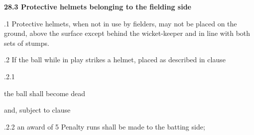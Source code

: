 \documentclass[12pt]{article}
\begin{document}
\vspace{\baselineskip}
{\fontsize{11pt}{13.2pt}\selectfont \textbf{28.3 \tabto{0.47in} Protective helmets belonging to the fielding side}\par}\par


\vspace{\baselineskip}
\begin{adjustwidth}{0.5in}{0.06in}
{\fontsize{9pt}{10.8pt}.1 \tabto{0.49in} Protective helmets, when not in use by fielders, may not be placed on the ground, above the surface except behind the wicket-keeper and in line with both sets of stumps.\par}\par

\end{adjustwidth}


\vspace{\baselineskip}
{\fontsize{9pt}{10.8pt}.2 \tabto{0.49in} If the ball while in play strikes a helmet, placed as described in clause \par}\par


\vspace{\baselineskip}
\begin{adjustwidth}{0.49in}{0.0in}
{\fontsize{9pt}{10.8pt}.2.1 \tabto{1.17in} {\fontsize{8pt}{9.6pt}\selectfont the ball shall become dead\par}\par}\par

\end{adjustwidth}


\vspace{\baselineskip}
\begin{adjustwidth}{1.12in}{0.0in}
{\fontsize{9pt}{10.8pt}\selectfont and, subject to clause \par}\par

\end{adjustwidth}


\vspace{\baselineskip}
\begin{adjustwidth}{0.49in}{0.0in}
{\fontsize{9pt}{10.8pt}.2.2 \tabto{1.17in} an award of 5 Penalty runs shall be made to the batting side;\par}\par

\end{adjustwidth}
\end{document}
